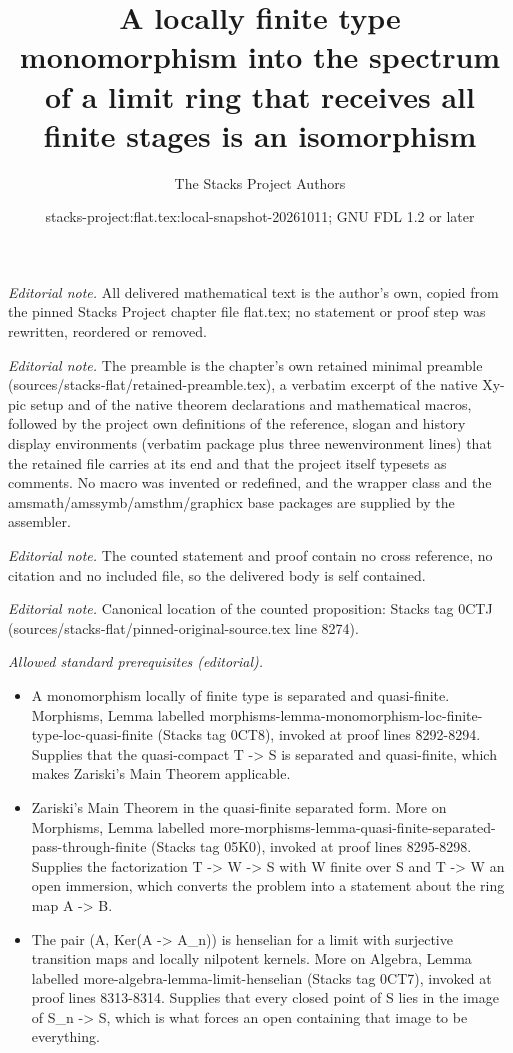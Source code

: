 \documentclass[10pt,a4paper]{amsart}
\title{A locally finite type monomorphism into the spectrum of a limit ring that receives all finite stages is an isomorphism}
\author{The Stacks Project Authors}
\date{stacks-project:flat.tex:local-snapshot-20261011; GNU FDL 1.2 or later}
\theoremstyle{plain}
\theoremstyle{definition}
\theoremstyle{remark}
\numberwithin{equation}{subsection}
\begin{document}
\maketitle
\noindent\textit{Editorial note.} All delivered mathematical text is the author's own, copied from the pinned Stacks Project chapter file flat.tex; no statement or proof step was rewritten, reordered or removed.\par\medskip
\noindent\textit{Editorial note.} The preamble is the chapter's own retained minimal preamble (sources/stacks-flat/retained-preamble.tex), a verbatim excerpt of the native Xy-pic setup and of the native theorem declarations and mathematical macros, followed by the project own definitions of the reference, slogan and history display environments (verbatim package plus three newenvironment lines) that the retained file carries at its end and that the project itself typesets as comments. No macro was invented or redefined, and the wrapper class and the amsmath/amssymb/amsthm/graphicx base packages are supplied by the assembler.\par\medskip
\noindent\textit{Editorial note.} The counted statement and proof contain no cross reference, no citation and no included file, so the delivered body is self contained.\par\medskip
\noindent\textit{Editorial note.} Canonical location of the counted proposition: Stacks tag 0CTJ (sources/stacks-flat/pinned-original-source.tex line 8274).\par\medskip
\noindent\textit{Allowed standard prerequisites (editorial).}\begin{itemize}
\item A monomorphism locally of finite type is separated and quasi-finite. Morphisms, Lemma labelled morphisms-lemma-monomorphism-loc-finite-type-loc-quasi-finite (Stacks tag 0CT8), invoked at proof lines 8292-8294. Supplies that the quasi-compact T -> S is separated and quasi-finite, which makes Zariski's Main Theorem applicable.
\item Zariski's Main Theorem in the quasi-finite separated form. More on Morphisms, Lemma labelled more-morphisms-lemma-quasi-finite-separated-pass-through-finite (Stacks tag 05K0), invoked at proof lines 8295-8298. Supplies the factorization T -> W -> S with W finite over S and T -> W an open immersion, which converts the problem into a statement about the ring map A -> B.
\item The pair (A, Ker(A -> A\_n)) is henselian for a limit with surjective transition maps and locally nilpotent kernels. More on Algebra, Lemma labelled more-algebra-lemma-limit-henselian (Stacks tag 0CT7), invoked at proof lines 8313-8314. Supplies that every closed point of S lies in the image of S\_n -> S, which is what forces an open containing that image to be everything.
\end{itemize}\medskip
\end{document}

